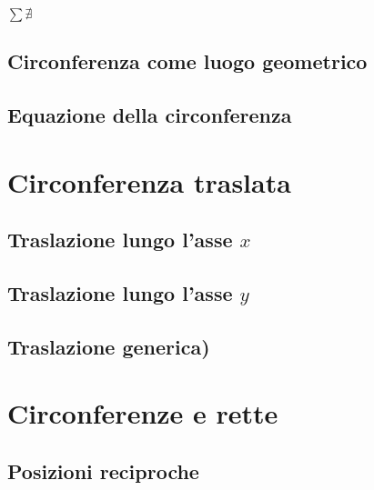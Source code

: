 \begin{center}
 $\sum \nexists$
\end{center}


\subsection{Circonferenza come luogo geometrico}
\label{subsec:circ_luogo}

\subsection{Equazione della circonferenza}
\label{subsec:circ_equazione}

% 

\section{Circonferenza traslata}
\label{sec:circ_circtraslata}

\subsection{Traslazione lungo l'asse \(x\)}
\label{subsec:circ_traslazionex}

\subsection{Traslazione lungo l'asse \(y\)}
\label{subsec:circ_traslazioney}

\subsection{Traslazione generica)}
\label{subsec:circ_traslazione}

\section{Circonferenze e rette}
\label{sec:circ_circrette}

\subsection{Posizioni reciproche}
\label{subsec:circ_equazione}

